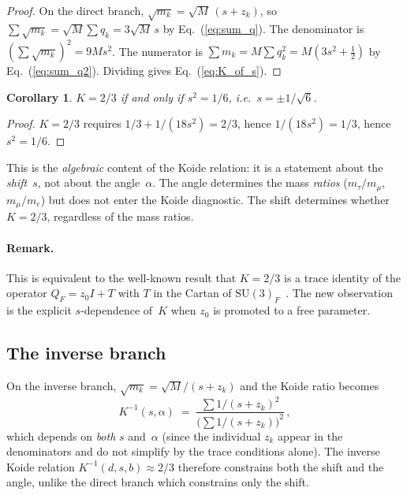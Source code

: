 \documentclass[preprint,12pt]{elsarticle}
\newtheorem{corollary}[theorem]{Corollary}
\newcommand{\SU}{\mathrm{SU}}
\begin{document}
\begin{proof}
On the direct branch, $\sqrt{m_k} = \sqrt{M}\,(s + z_k)$, so
$\sum \sqrt{m_k} = \sqrt{M}\sum q_k = 3\sqrt{M}\,s$
by Eq.~(\ref{eq:sum_q}).  The denominator is
$(\sum\sqrt{m_k})^2 = 9 M s^2$.
The numerator is
$\sum m_k = M \sum q_k^2 = M(3s^2 + \tfrac{1}{2})$
by Eq.~(\ref{eq:sum_q2}).
Dividing gives Eq.~(\ref{eq:K_of_s}).
\end{proof}

\begin{corollary}
$K = 2/3$ if and only if $s^2 = 1/6$, i.e.\
$s = \pm 1/\sqrt{6}$.
\end{corollary}

\begin{proof}
$K = 2/3$ requires $1/3 + 1/(18s^2) = 2/3$, hence
$1/(18s^2) = 1/3$, hence $s^2 = 1/6$.
\end{proof}

\noindent This is the \emph{algebraic} content of the Koide
relation: it is a statement about the \emph{shift}~$s$, not
about the angle~$\alpha$.  The angle determines the mass
\emph{ratios} ($m_\tau/m_\mu$, $m_\mu/m_e$) but does not
enter the Koide diagnostic.  The shift determines whether
$K = 2/3$, regardless of the mass ratios.

\paragraph{Remark.}
This is equivalent to the well-known result that $K = 2/3$
is a trace identity of the operator $Q_F = z_0 I + T$
with $T$ in the Cartan of $\SU(3)_F$~\cite{letter_q2}.
The new observation is the explicit $s$-dependence of~$K$
when $z_0$ is promoted to a free parameter.


\subsection{The inverse branch}

On the inverse branch, $\sqrt{m_k} = \sqrt{M}/(s + z_k)$ and the
Koide ratio becomes
\begin{equation}
  K^{-1}(s, \alpha) \;=\;
  \frac{\sum 1/(s + z_k)^2}
  {\bigl(\sum 1/(s + z_k)\bigr)^2}\,,
  \label{eq:Kinv}
\end{equation}
which depends on \emph{both} $s$ and~$\alpha$
(since the individual $z_k$ appear in the denominators
and do not simplify by the trace conditions alone).
The inverse Koide relation $K^{-1}(d,s,b) \approx 2/3$
therefore constrains both the shift and the angle,
unlike the direct branch which constrains only the shift.
\end{document}

